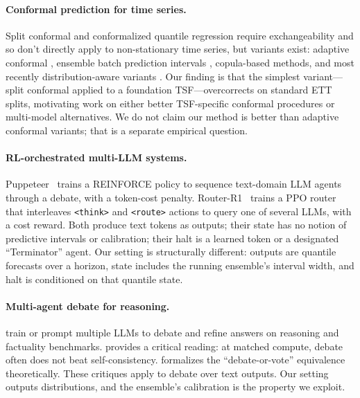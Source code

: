 \documentclass{article}
\begin{document}
\paragraph{Conformal prediction for time series.}
Split conformal \cite{vovk2005algorithmic} and conformalized quantile
regression \cite{romano2019cqr} require exchangeability and so don't
directly apply to non-stationary time series, but variants exist:
adaptive conformal \cite{gibbs2021acp}, ensemble batch prediction
intervals \cite{xu2021ensemble}, copula-based methods, and most
recently distribution-aware variants
\cite{stankeviciute2021conformal,chernozhukov2021distributional}.
Our finding is that the simplest variant---split conformal applied
to a foundation TSF---overcorrects on standard ETT splits, motivating
work on either better TSF-specific conformal procedures or
multi-model alternatives. We do not claim our method is better than
adaptive conformal variants; that is a separate empirical question.

\paragraph{RL-orchestrated multi-LLM systems.}
Puppeteer~\cite{wei2025puppeteer} trains a REINFORCE policy to
sequence text-domain LLM agents through a debate, with a token-cost
penalty. Router-R1~\cite{tang2025routerr1} trains a PPO router that
interleaves \texttt{<think>} and \texttt{<route>} actions to query
one of several LLMs, with a cost reward. Both produce text tokens
as outputs; their state has no notion of predictive intervals or
calibration; their halt is a learned token or a designated
``Terminator'' agent. Our setting is structurally different: outputs
are quantile forecasts over a horizon, state includes the
running ensemble's interval width, and halt is conditioned on that
quantile state.

\paragraph{Multi-agent debate for reasoning.}
\cite{du2024improving,liang2023encouraging,chan2023chateval} train or
prompt multiple LLMs to debate and refine answers on reasoning and
factuality benchmarks. \cite{smit2024should} provides a critical
reading: at matched compute, debate often does not beat
self-consistency. \cite{kumar2025debate} formalizes the
``debate-or-vote'' equivalence theoretically. These critiques apply
to debate over text outputs. Our setting outputs distributions, and
the ensemble's calibration is the property we exploit.
\end{document}
